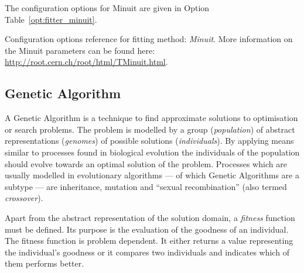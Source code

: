 The configuration options for Minuit are given in Option Table~\ref{opt:fitter_minuit}.
\begin{option}[t]

\caption[.]{\optionCaptionSize 
     Configuration options reference for fitting method: {\em Minuit}. More information 
     on the Minuit parameters can be found here: \url{http://root.cern.ch/root/html/TMinuit.html}.
}
\label{opt:fitter_minuit}
\end{option}

\subsection{Genetic Algorithm}
\label{sec:geneticAlgorithm}

A Genetic Algorithm is a technique to find approximate solutions to optimisation or 
search problems. The problem is modelled by a group 
({\em population}) of abstract representations ({\em genomes}) of possible solutions 
({\em individuals}). By applying means similar to processes found in biological 
evolution the individuals of the population should evolve towards an optimal 
solution of the problem. Processes which are usually modelled in evolutionary 
algorithms --- of which Genetic Algorithms are a subtype --- are inheritance, mutation 
and ``sexual recombination'' (also termed {\em crossover}). 

Apart from the abstract representation of the solution domain, a {\em fitness} 
function must be defined. Its purpose is the evaluation of the goodness of an 
individual. The fitness function is problem dependent. It either returns a value 
representing the individual's goodness or it compares two individuals and indicates 
which of them performs better. 

